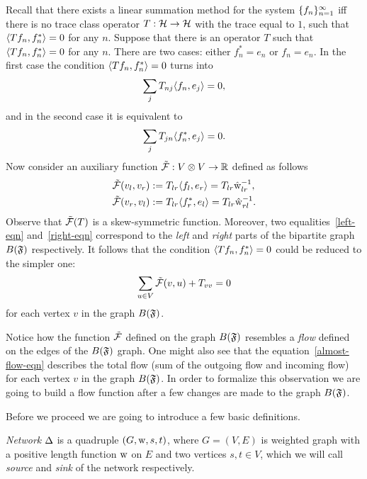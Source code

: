 \documentclass[12pt]{article}
\begin{document}
    Recall that there exists a linear summation method for the system $\seq{f}$
      iff there is no trace class operator $T: \cal{H} \to \cal{H}$ with the trace equal to $1$,
      such that $\inner{Tf_n}{f_n^*} = 0$ for any $n$.
    Suppose that there is an operator $T$ such that $\inner{Tf_n}{f_n^*} = 0$ for any $n$.
    There are two cases: either $f^*_n = e_n$ or $f_n = e_n$.
    In the first case the condition $\inner{Tf_n}{f_n^*} = 0$ turns into
    \begin{equation}
        \label{left-eqn}
        \sum_j T_{nj} \inner{f_n}{e_j} = 0,
    \end{equation}
    and in the second case it is equivalent to
    \begin{equation}
        \label{right-eqn}
        \sum_j T_{jn} \inner{f^*_n}{e_j} = 0.
    \end{equation}
    Now consider an auxiliary function $\flowsgn: V \otimes V \to \mathbb{R}$ defined as follows
    \begin{align*}
        &\flowsgn(v_l, v_r) := T_{lr} \inner{f_l}{e_r} = T_{lr} \wt_{lr}^{-1},\\
        &\flowsgn(v_r, v_l) := T_{lr} \inner{f^*_r}{e_l} = T_{lr} \wt_{rl}^{-1}.
    \end{align*}
    Observe that $\flowsgn(T)$ is a skew-symmetric function.
    Moreover, two equalities~\eqref{left-eqn} and~\eqref{right-eqn} correspond to the \emph{left} and \emph{right}
      parts of the bipartite graph $B(\fsys)$ respectively.
    It follows that the condition $\inner{Tf_n}{f_n^*} = 0$ could be reduced to the simpler one:
    \begin{equation}
      \label{almost-flow-eqn}
      \sum_{u \in V} \flowsgn(v, u) + T_{vv} = 0
    \end{equation}
      for each vertex $v$ in the graph $B(\fsys)$.
    \begin{remark}
      Notice how the function $\flowsgn$ defined on the graph $B(\fsys)$ resembles
        a \emph{flow} defined on the edges of the $B(\fsys)$ graph.
      One might also see that the equation~\eqref{almost-flow-eqn} describes the total flow (sum of the outgoing flow and incoming flow) 
        for each vertex $v$ in the graph $B(\fsys)$.
      In order to formalize this observation we are going to build a flow function
        after a few changes are made to the graph $B(\fsys)$.
    \end{remark}
    Before we proceed we are going to introduce a few basic definitions.
    \begin{definition}
        \emph{Network} $\net$ is a quadruple $(G, \wtp, s, t)$, where $G = (V, E)$ is weighted graph
        with a positive length function $\wtp$ on $E$ and two vertices $s, t \in V$, which
        we will call \emph{source} and \emph{sink} of the network respectively.
    \end{definition}
\end{document}
